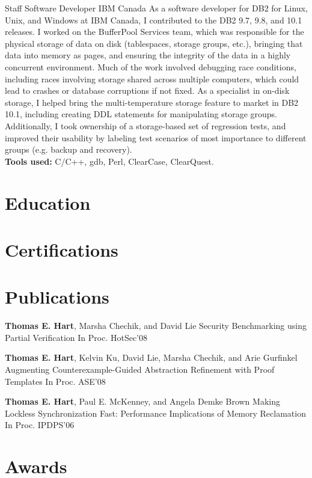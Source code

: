 \documentclass[11pt,letterpaper]{moderncv}
\begin{document}
\vspace*{0.2\baselineskip}
{Staff Software Developer}
{IBM Canada}
{}{}
{
As a software developer for DB2 for Linux, Unix, and Windows at IBM Canada, I contributed to the DB2 9.7, 9.8, and 10.1 releases. I worked on the BufferPool Services team, which was responsible for the physical storage of data on disk (tablespaces, storage groups, etc.), bringing that data into memory as pages, and ensuring the integrity of the data in a highly concurrent environment. Much of the work involved debugging race conditions, including races involving storage shared across multiple computers, which could lead to crashes or database corruptions if not fixed. As a specialist in on-disk storage, I helped bring the multi-temperature storage feature to market in DB2 10.1, including creating DDL statements for manipulating storage groups. Additionally, I took ownership of a storage-based set of regression tests, and improved their usability by labeling test scenarios of most importance to different groups (e.g. backup and recovery). \\
\textbf{Tools used:} C/C++, gdb, Perl, ClearCase, ClearQuest. 
}

\section{Education}

\section{Certifications}

\section{Publications}

{\textbf{Thomas E. Hart}\textnormal{, Marsha Chechik, and David Lie}}
{Security Benchmarking using Partial Verification}
{In Proc. HotSec’08}
{}{}{}

{\textbf{Thomas E. Hart}\textnormal{, Kelvin Ku, David Lie, Marsha Chechik, and Arie Gurfinkel}}
{Augmenting Counterexample-Guided Abstraction Refinement with Proof Templates}
{In Proc. ASE’08}
{}{}{}

{\textbf{Thomas E. Hart}\textnormal{, Paul E. McKenney, and Angela Demke Brown}}
{Making Lockless Synchronization Fast: Performance Implications of Memory Reclamation}
{In Proc. IPDPS'06}
{}{}{}

\section{Awards}
\end{document}
